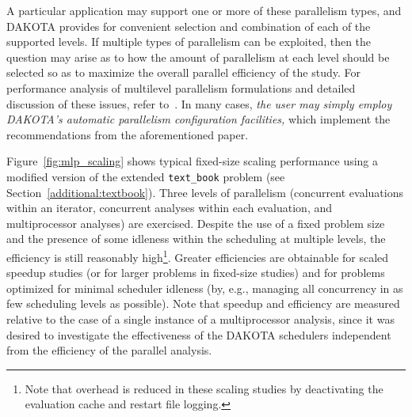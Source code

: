 A particular application may support one or more of these parallelism
types, and DAKOTA provides for convenient selection and combination of
each of the supported levels. If multiple types of parallelism can be
exploited, then the question may arise as to how the amount of
parallelism at each level should be selected so as to maximize the
overall parallel efficiency of the study. For performance analysis of
multilevel parallelism formulations and detailed discussion of these
issues, refer to~\cite{Eld00}.  In many cases, \emph{the user may
simply employ DAKOTA's automatic parallelism configuration facilities,}
which implement the recommendations from the aforementioned paper.

Figure~\ref{fig:mlp_scaling} shows typical fixed-size scaling
performance using a modified version of the extended
\texttt{text\_book} problem (see Section~\ref{additional:textbook}).
Three levels of parallelism (concurrent evaluations within an
iterator, concurrent analyses within each evaluation, and
multiprocessor analyses) are exercised.  Despite the use of a fixed
problem size and the presence of some idleness within the scheduling
at multiple levels, the efficiency is still reasonably
high\footnote{Note that overhead is reduced in these scaling studies
by deactivating the evaluation cache and restart file logging.}.
Greater efficiencies are obtainable for scaled speedup studies (or for
larger problems in fixed-size studies) and for problems optimized for
minimal scheduler idleness (by, e.g., managing all concurrency in as
few scheduling levels as possible).  Note that speedup and efficiency
are measured relative to the case of a single instance of a
multiprocessor analysis, since it was desired to investigate the
effectiveness of the DAKOTA schedulers independent from the efficiency
of the parallel analysis.
